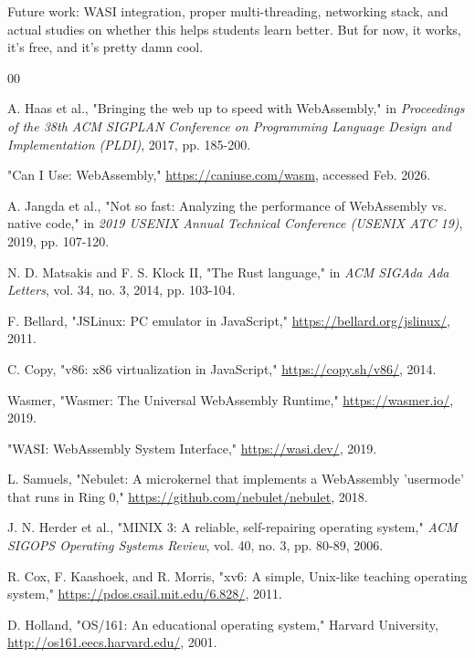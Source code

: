 \documentclass[conference]{IEEEtran}
\begin{document}
Future work: WASI integration, proper multi-threading, networking stack, and actual studies on whether this helps students learn better. But for now, it works, it's free, and it's pretty damn cool.

\begin{thebibliography}{00}

 A. Haas et al., "Bringing the web up to speed with WebAssembly," in \emph{Proceedings of the 38th ACM SIGPLAN Conference on Programming Language Design and Implementation (PLDI)}, 2017, pp. 185-200.

 "Can I Use: WebAssembly," \url{https://caniuse.com/wasm}, accessed Feb. 2026.

 A. Jangda et al., "Not so fast: Analyzing the performance of WebAssembly vs. native code," in \emph{2019 USENIX Annual Technical Conference (USENIX ATC 19)}, 2019, pp. 107-120.

 N. D. Matsakis and F. S. Klock II, "The Rust language," in \emph{ACM SIGAda Ada Letters}, vol. 34, no. 3, 2014, pp. 103-104.

 F. Bellard, "JSLinux: PC emulator in JavaScript," \url{https://bellard.org/jslinux/}, 2011.

 C. Copy, "v86: x86 virtualization in JavaScript," \url{https://copy.sh/v86/}, 2014.

 Wasmer, "Wasmer: The Universal WebAssembly Runtime," \url{https://wasmer.io/}, 2019.

 "WASI: WebAssembly System Interface," \url{https://wasi.dev/}, 2019.

 L. Samuels, "Nebulet: A microkernel that implements a WebAssembly 'usermode' that runs in Ring 0," \url{https://github.com/nebulet/nebulet}, 2018.

 J. N. Herder et al., "MINIX 3: A reliable, self-repairing operating system," \emph{ACM SIGOPS Operating Systems Review}, vol. 40, no. 3, pp. 80-89, 2006.

 R. Cox, F. Kaashoek, and R. Morris, "xv6: A simple, Unix-like teaching operating system," \url{https://pdos.csail.mit.edu/6.828/}, 2011.

 D. Holland, "OS/161: An educational operating system," Harvard University, \url{http://os161.eecs.harvard.edu/}, 2001.

\end{thebibliography}
\end{document}
